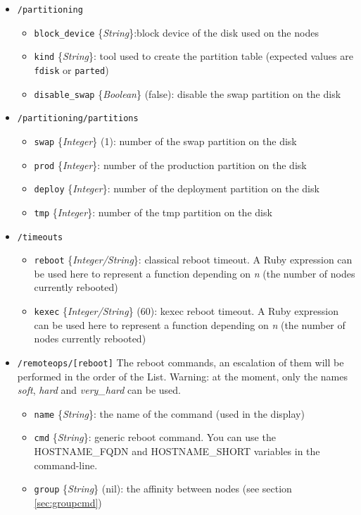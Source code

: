 \documentclass[a4wide,10pt,oneside]{book}
\newcommand{\ypath}[1]{\texttt{#1}}
\newcommand{\yfield}[2]{\texttt{#1} {\small\{{\emph{#2}}\}}:}
\newcommand{\yfieldd}[3]{\texttt{#1} {\small\{{\emph{#2}}\}} {\small(}#3{\small)}:}
\begin{document}
\begin{itemize}
  \item \ypath{/partitioning}
  \begin{itemize}
    \item \yfield{block\_device}{String}block device of the disk used on the nodes
    \item \yfield{kind}{String} tool used to create the partition table (expected values are \texttt{fdisk} or \texttt{parted})
    \item \yfieldd{disable\_swap}{Boolean}{false} disable the swap partition on the disk
  \end{itemize}

  \item \ypath{/partitioning/partitions}
  \begin{itemize}
    \item \yfieldd{swap}{Integer}{1} number of the swap partition on the disk
    \item \yfield{prod}{Integer} number of the production partition on the disk
    \item \yfield{deploy}{Integer} number of the deployment partition on the disk
    \item \yfield{tmp}{Integer} number of the tmp partition on the disk
  \end{itemize}

  \item \ypath{/timeouts}
  \begin{itemize}
    \item \yfield{reboot}{Integer/String} classical reboot timeout. A Ruby expression can be used here to represent a function depending on \emph{n} (the number of nodes currently rebooted)
    \item \yfieldd{kexec}{Integer/String}{60} kexec reboot timeout. A Ruby expression can be used here to represent a function depending on \emph{n} (the number of nodes currently rebooted)
  \end{itemize}

  \item \ypath{/remoteops/[reboot]} The reboot commands, an escalation of them will be performed in the order of the List. Warning: at the moment, only the names \emph{soft}, \emph{hard} and \emph{very\_hard} can be used.
  \begin{itemize}
    \item \yfield{name}{String} the name of the command (used in the display)
    \item \yfield{cmd}{String} generic reboot command. You can use the HOSTNAME\_FQDN and HOSTNAME\_SHORT variables in the command-line.
    \item \yfieldd{group}{String}{nil} the affinity between nodes (see section \ref{sec:groupcmd})
  \end{itemize}


\end{itemize}
\end{document}
